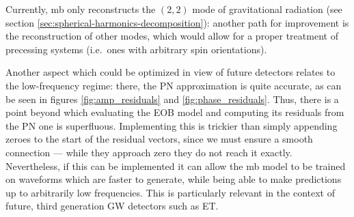 \documentclass[main.tex]{subfiles}
\begin{document}
Currently, \ac{mb} only reconstructs the \((2, 2)\) mode of gravitational radiation (see section \ref{sec:spherical-harmonics-decomposition}): another path for improvement is the reconstruction of other modes, which would allow for a proper treatment of precessing systems (i.e.\ ones with arbitrary spin orientations). 

Another aspect which could be optimized in view of future detectors relates to the low-frequency regime: there, the \ac{PN} approximation is quite accurate, as can be seen in figures \ref{fig:amp_residuals} and \ref{fig:phase_residuals}. 
Thus, there is a point beyond which evaluating the \ac{EOB} model and computing its residuals from the \ac{PN} one is superfluous. 
Implementing this is trickier than simply appending zeroes to the start of the residual vectors, since we must ensure a smooth connection --- while they approach zero they do not reach it exactly. 
Nevertheless, if this can be implemented it can allow the \ac{mb} model to be trained on waveforms which are faster to generate, while being able to make predictions up to arbitrarily low frequencies.
This is particularly relevant in the context of future, third generation \ac{GW} detectors such as \ac{ET}.

\end{document}
